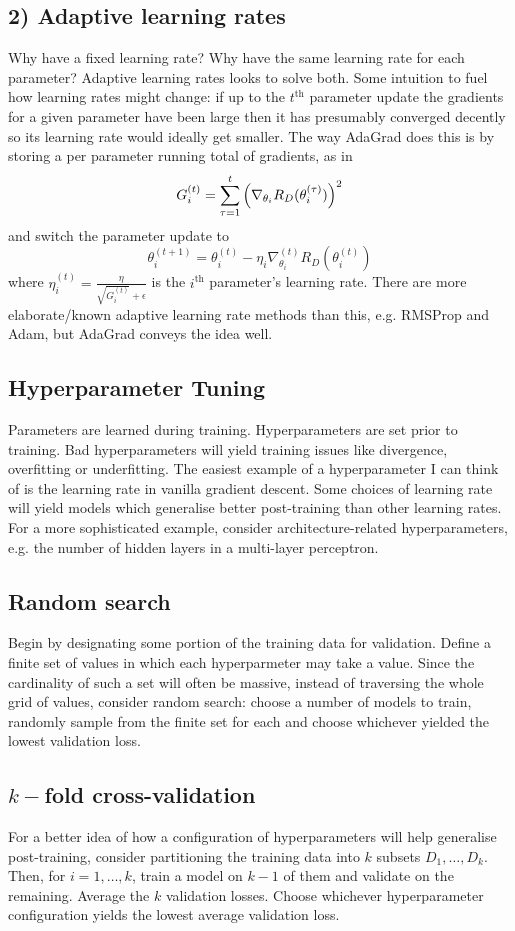 \documentclass[11pt]{article}
\begin{document}
\subsection*{2) Adaptive learning rates}
Why have a fixed learning rate? Why have the same learning rate for each parameter? Adaptive learning rates looks to solve both. Some intuition to fuel how learning rates might change: if up to the $t^{\text{th}}$ parameter update the gradients for a given parameter have been large then it has presumably converged decently so its learning rate would ideally get smaller. The way AdaGrad does this is by storing a per parameter running total of gradients, as in
$$
G_i^{(t)}
=
\sum_{\tau=1}^t\left(\nabla_{\theta_i}R_D(\theta_i^{(\tau)})\right)^2
$$
and switch the parameter update to
$$
\theta_i^{(t+1)}
=
\theta_i^{(t)}-\eta_i\nabla_{\theta_i}^{(t)}R_D(\theta_i^{(t)})
$$
where $\eta_i^{(t)}=\frac{\eta}{\sqrt{G_i^{(t)}}+\epsilon}$ is the $i^{\text{th}}$ parameter's learning rate. There are more elaborate/known adaptive learning rate methods than this, e.g. RMSProp and Adam, but AdaGrad conveys the idea well.

\subsection{Hyperparameter Tuning}
Parameters are learned during training. Hyperparameters are set prior to training. Bad hyperparameters will yield training issues like divergence, overfitting or underfitting. The easiest example of a hyperparameter I can think of is the learning rate in vanilla gradient descent. Some choices of learning rate will yield models which generalise better post-training than other learning rates. For a more sophisticated example, consider architecture-related hyperparameters, e.g. the number of hidden layers in a multi-layer perceptron.

\subsection*{Random search}
Begin by designating some portion of the training data for validation. Define a finite set of values in which each hyperparmeter may take a value. Since the cardinality of such a set will often be massive, instead of traversing the whole grid of values, consider random search: choose a number of models to train, randomly sample from the finite set for each and choose whichever yielded the lowest validation loss.

\subsection*{$k-$fold cross-validation}
For a better idea of how a configuration of hyperparameters will help generalise post-training, consider partitioning the training data into $k$ subsets $D_1,\dots,D_k$. Then, for $i=1,\dots,k$, train a model on $k-1$ of them and validate on the remaining. Average the $k$ validation losses. Choose whichever hyperparameter configuration yields the lowest average validation loss.
\end{document}
